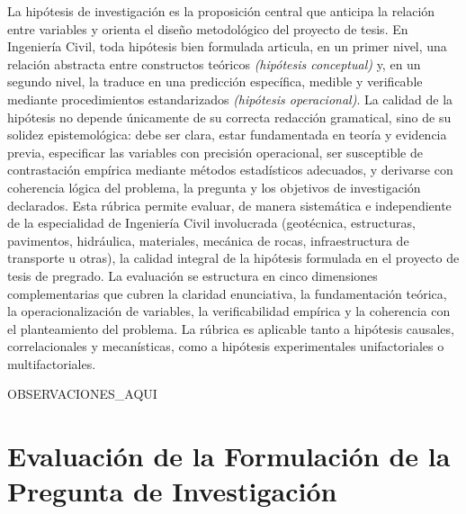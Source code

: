 \documentclass[12pt,a4paper]{report}
\begin{document}
La hipótesis de investigación es la proposición central que anticipa la relación entre variables y orienta el diseño metodológico del proyecto de tesis. En Ingeniería Civil, toda hipótesis bien formulada articula, en un primer nivel, una relación abstracta entre constructos teóricos \textit{(hipótesis conceptual)} y, en un segundo nivel, la traduce en una predicción específica, medible y verificable mediante procedimientos estandarizados \textit{(hipótesis operacional)}. La calidad de la hipótesis no depende únicamente de su correcta redacción gramatical, sino de su solidez epistemológica: debe ser clara, estar fundamentada en teoría y evidencia previa, especificar las variables con precisión operacional, ser susceptible de contrastación empírica mediante métodos estadísticos adecuados, y derivarse con coherencia lógica del problema, la pregunta y los objetivos de investigación declarados. Esta rúbrica permite evaluar, de manera sistemática e independiente de la especialidad de Ingeniería Civil involucrada (geotécnica, estructuras, pavimentos, hidráulica, materiales, mecánica de rocas, infraestructura de transporte u otras), la calidad integral de la hipótesis formulada en el proyecto de tesis de pregrado. La evaluación se estructura en cinco dimensiones complementarias que cubren la claridad enunciativa, la fundamentación teórica, la operacionalización de variables, la verificabilidad empírica y la coherencia con el planteamiento del problema. La rúbrica es aplicable tanto a hipótesis causales, correlacionales y mecanísticas, como a hipótesis experimentales unifactoriales o multifactoriales.\par


{{OBSERVACIONES_AQUI}}


\section{Evaluación de la Formulación de la Pregunta de Investigación}
\end{document}
